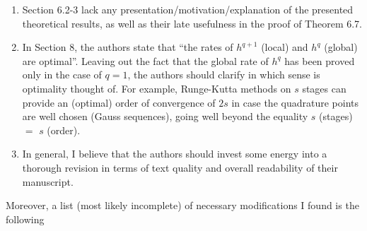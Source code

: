 \documentclass{article}
\begin{document}
\begin{enumerate}
\item Section 6.2-3 lack any presentation/motivation/explanation of the presented theoretical results, as well as their late usefulness in the proof of Theorem 6.7.
\item In Section 8, the authors state that ``the rates of $h^{q+1}$ (local) and $h^q$ (global) are optimal''. Leaving out the fact that the global rate of $h^q$ has been proved only in the case of $q = 1$, the authors should clarify in which sense is optimality thought of. For example, Runge-Kutta methods on $s$ stages can provide an (optimal) order of convergence of $2s$ in case the quadrature points are well chosen (Gauss sequences), going well beyond the equality $s$ (stages) $=$ $s$ (order).
\item In general, I believe that the authors should invest some energy into a thorough revision in terms of text quality and overall readability of their manuscript.
\end{enumerate}
Moreover, a list (most likely incomplete) of necessary modifications I found is the following
\end{document}
